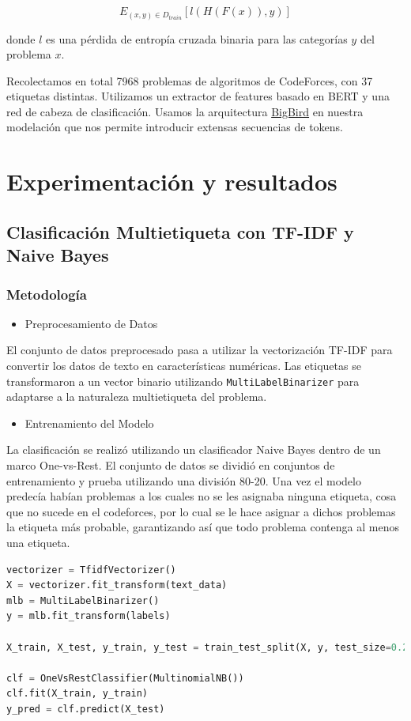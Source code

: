 \documentclass{article}
\begin{document}
$$
    E_{(x, y) \in D_{train}} [ l(H(F(x)), y) ]
$$

donde $l$ es una pérdida de entropía cruzada binaria para las categorías $y$ del problema $x$.

Recolectamos en total 7968 problemas de algoritmos de CodeForces, con 37 etiquetas distintas. 
Utilizamos un extractor de features basado en BERT y una red de cabeza de 
clasificación. Usamos la arquitectura \href{https://huggingface.co/google/bigbird-roberta-base}{BigBird}
en nuestra modelación que nos permite introducir extensas secuencias de tokens.
\newpage
\section{Experimentación y resultados}

\subsection{Clasificación Multietiqueta con TF-IDF y Naive Bayes}
\subsubsection{Metodología}
\begin{itemize}
    \item Preprocesamiento de Datos
\end{itemize}
El conjunto de datos preprocesado pasa a utilizar la vectorización TF-IDF para convertir los datos de texto en características numéricas. Las etiquetas se transformaron a un vector binario utilizando \texttt{MultiLabelBinarizer} para adaptarse a la naturaleza multietiqueta del problema.

\begin{itemize}
    \item Entrenamiento del Modelo
\end{itemize}
La clasificación se realizó utilizando un clasificador Naive Bayes dentro de un marco One-vs-Rest. El conjunto de datos se dividió en conjuntos de entrenamiento y prueba utilizando una división 80-20. Una vez el modelo predecía habían problemas a los cuales no se les
asignaba ninguna etiqueta, cosa que no sucede en el codeforces, por lo cual se le hace asignar a dichos problemas la etiqueta más probable, garantizando así que todo problema contenga al menos una etiqueta.

\begin{lstlisting}[language=Python, caption=Naive Bayes]
vectorizer = TfidfVectorizer()
X = vectorizer.fit_transform(text_data)
mlb = MultiLabelBinarizer()
y = mlb.fit_transform(labels)

X_train, X_test, y_train, y_test = train_test_split(X, y, test_size=0.2, random_state=42)

clf = OneVsRestClassifier(MultinomialNB())
clf.fit(X_train, y_train)
y_pred = clf.predict(X_test)
\end{lstlisting}
\end{document}
